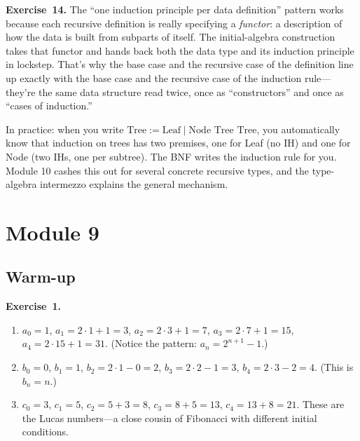 \documentclass[11pt]{article}
\begin{document}
\medskip
\textbf{Exercise~14.}
The ``one induction principle per data definition'' pattern works because each recursive definition is really specifying a \emph{functor}: a description of how the data is built from subparts of itself. The initial-algebra construction takes that functor and hands back both the data type and its induction principle in lockstep. That's why the base case and the recursive case of the definition line up exactly with the base case and the recursive case of the induction rule---they're the same data structure read twice, once as ``constructors'' and once as ``cases of induction.''

In practice: when you write $\text{Tree} := \text{Leaf} \mid \text{Node Tree Tree}$, you automatically know that induction on trees has two premises, one for Leaf (no IH) and one for Node (two IHs, one per subtree). The BNF writes the induction rule for you. Module 10 cashes this out for several concrete recursive types, and the type-algebra intermezzo explains the general mechanism.

\section*{Module 9}

\subsection*{Warm-up}

\textbf{Exercise~1.}
\begin{enumerate}[label=(\alph*)]
  \item $a_0 = 1$, $a_1 = 2 \cdot 1 + 1 = 3$, $a_2 = 2 \cdot 3 + 1 = 7$, $a_3 = 2 \cdot 7 + 1 = 15$, $a_4 = 2 \cdot 15 + 1 = 31$. (Notice the pattern: $a_n = 2^{n+1} - 1$.)
  \item $b_0 = 0$, $b_1 = 1$, $b_2 = 2 \cdot 1 - 0 = 2$, $b_3 = 2 \cdot 2 - 1 = 3$, $b_4 = 2 \cdot 3 - 2 = 4$. (This is $b_n = n$.)
  \item $c_0 = 3$, $c_1 = 5$, $c_2 = 5 + 3 = 8$, $c_3 = 8 + 5 = 13$, $c_4 = 13 + 8 = 21$. These are the Lucas numbers---a close cousin of Fibonacci with different initial conditions.
\end{enumerate}
\end{document}
